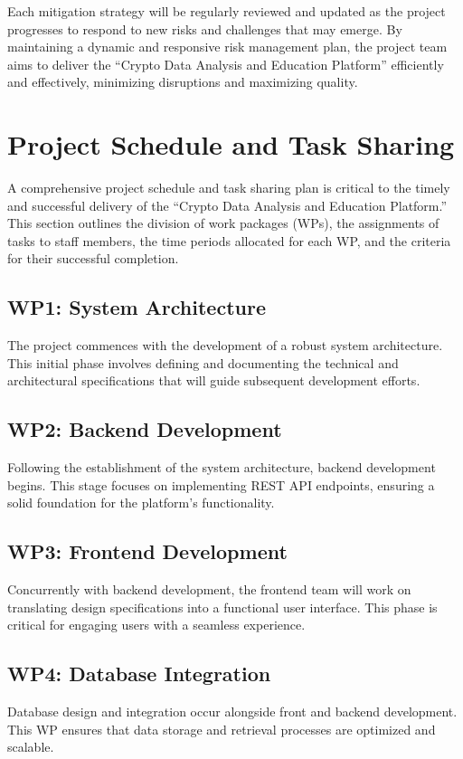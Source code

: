 \documentclass[12pt]{report}
\begin{document}
Each mitigation strategy will be regularly reviewed and updated as the project progresses to respond to new risks and challenges that may emerge. By maintaining a dynamic and responsive risk management plan, the project team aims to deliver the ``Crypto Data Analysis and Education Platform'' efficiently and effectively, minimizing disruptions and maximizing quality.


\section{Project Schedule and Task Sharing}
A comprehensive project schedule and task sharing plan is critical to the timely and successful delivery of the ``Crypto Data Analysis and Education Platform.'' This section outlines the division of work packages (WPs), the assignments of tasks to staff members, the time periods allocated for each WP, and the criteria for their successful completion.

\subsection{WP1: System Architecture}
The project commences with the development of a robust system architecture. This initial phase involves defining and documenting the technical and architectural specifications that will guide subsequent development efforts.

\subsection{WP2: Backend Development}
Following the establishment of the system architecture, backend development begins. This stage focuses on implementing REST API endpoints, ensuring a solid foundation for the platform's functionality.

\subsection{WP3: Frontend Development}
Concurrently with backend development, the frontend team will work on translating design specifications into a functional user interface. This phase is critical for engaging users with a seamless experience.

\subsection{WP4: Database Integration}
Database design and integration occur alongside front and backend development. This WP ensures that data storage and retrieval processes are optimized and scalable.
\end{document}
